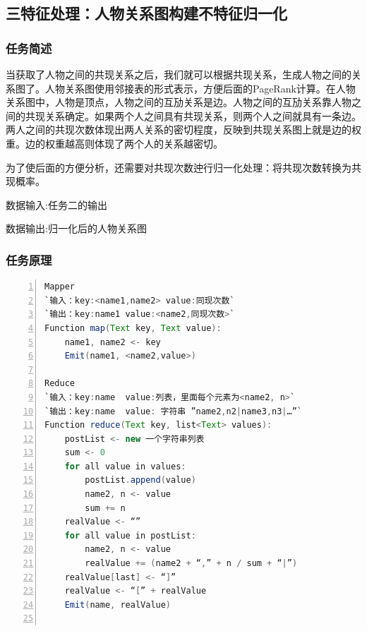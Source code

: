 \documentclass{ctexart}
\begin{document}
	\subsection{三\quad 特征处理：人物关系图构建不特征归一化}
	\subsubsection{任务简述}
	当获取了人物之间的共现关系之后，我们就可以根据共现关系，生成人物之间的关系图了。人物关系图使用邻接表的形式表示，方便后面的PageRank计算。在人物关系图中，人物是顶点，人物之间的互劢关系是边。人物之间的互劢关系靠人物之间的共现关系确定。如果两个人之间具有共现关系，则两个人之间就具有一条边。两人之间的共现次数体现出两人关系的密切程度，反映到共现关系图上就是边的权重。边的权重越高则体现了两个人的关系越密切。\par
	为了使后面的方便分析，还需要对共现次数迚行归一化处理：将共现次数转换为共现概率。 \\ 
	\par 数据输入:任务二的输出
	\par	数据输出:归一化后的人物关系图
	\subsubsection{任务原理}
	\begin{lstlisting}[language=java, numbers=left, numberstyle=\tiny, frame=shadowbox, basicstyle=\ttfamily, escapeinside=``] 
Mapper
`输入：key:<name1,name2> value:同现次数`
`输出：key:name1 value:<name2,同现次数>`
Function map(Text key, Text value):
	name1, name2 <- key
	Emit(name1, <name2,value>)

Reduce
`输入：key:name  value:列表，里面每个元素为<name2, n>`
`输出：key:name  value: 字符串 ”name2,n2|name3,n3|…”`
Function reduce(Text key, list<Text> values):
	postList <- new 一个字符串列表
	sum <- 0
	for all value in values: 
		postList.append(value)
		name2, n <- value
		sum += n
	realValue <- “”
	for all value in postList:
		name2, n <- value
		realValue += (name2 + “,” + n / sum + “|”)
	realValue[last] <- “]”
	realValue <- “[” + realValue
	Emit(name, realValue)


	\end{lstlisting}
\end{document}
